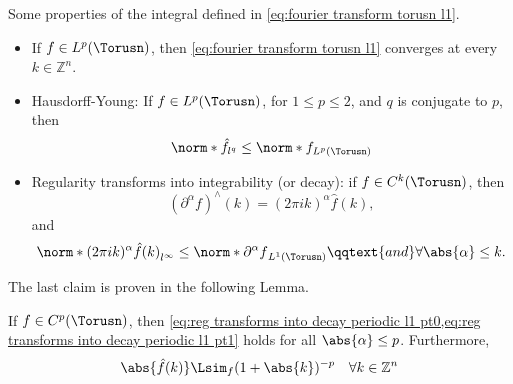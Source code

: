 \documentclass[../main-v2-manifolds.tex]{subfiles}
\begin{document}
Some properties of the integral defined in \cref{eq:fourier transform torusn l1}.
\begin{itemize}
    \item If $f\in L^p(\Torusn)$, then \cref{eq:fourier transform torusn l1} converges at every $k\in\mathbb{Z}^n$. 
    \item Hausdorff-Young: If $f\in L^p(\Torusn)$, for $1\leq p\leq 2$, and $q$ is conjugate to $p$, then 
    \[
        \norm*{\hat{f}}_{l^q}\leq\norm*{f}_{L^p(\Torusn)}
    \]
    \item Regularity transforms into integrability (or decay): if $f\in C^k(\Torusn)$, then 
    \begin{equation}
        (\partial^\alpha f)^\wedge(k) = (2\pi i k)^{\alpha}\hat{f}(k),
        \label{eq:reg transforms into decay periodic l1 pt0}
    \end{equation}
    and
    \begin{equation}
        \norm*{(2\pi i k)^{\alpha}\hat{f}(k)}_{l^\infty}\leq \norm*{\partial^\alpha f}_{L^1(\Torusn)}\qqtext{and}\forall\abs{\alpha}\leq k.
        \label{eq:reg transforms into decay periodic l1 pt1}
    \end{equation}
\end{itemize}
The last claim is proven in the following Lemma.
\begin{lemma}\label{lem:regularity transforms into decay periodic functions}
    If $f\in C^p(\Torusn)$, then \cref{eq:reg transforms into decay periodic l1 pt0,eq:reg transforms into decay periodic l1 pt1} holds for all $\abs{\alpha}\leq p$. Furthermore, 
    \begin{equation}
        \abs{\hat{f}(k)}\Lsim_{f} (1+\abs{k})^{-p}\quad\forall k\in\mathbb{Z}^n
        \label{eq:reg transforms into decay periodic l1 pt2}
    \end{equation}
\end{lemma}
\end{document}
